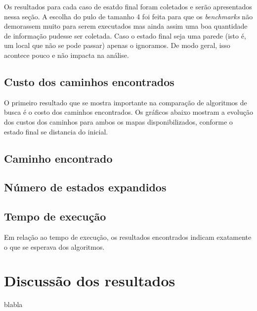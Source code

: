 \documentclass{article}
\begin{document}
Os resultados para cada caso de esatdo final foram coletados e serão apresentados nessa seção. A escolha do pulo de tamanho 4 foi feita para que os \textit{benchmarks} não demorassem muito para serem executados mas ainda assim
uma boa quantidade de informação pudesse ser coletada. Caso o estado final seja uma parede (isto é, um local que não se pode passar) apenas o ignoramos. De modo geral, isso acontece pouco e não impacta na análise.

\subsection{Custo dos caminhos encontrados}

O primeiro resultado que se mostra importante na comparação de algoritmos de busca é o costo dos caminhos encontrados. Os gráficos abaixo mostram a evolução dos custos dos caminhos para ambos os mapas disponibilizados,
conforme o estado final se distancia do inicial.

\subsection{Caminho encontrado}

\subsection{Número de estados expandidos}

\subsection{Tempo de execução}

Em relação ao tempo de execução, os resultados encontrados indicam exatamente o que se esperava dos algoritmos.

\section{Discussão dos resultados}

blabla
\end{document}
